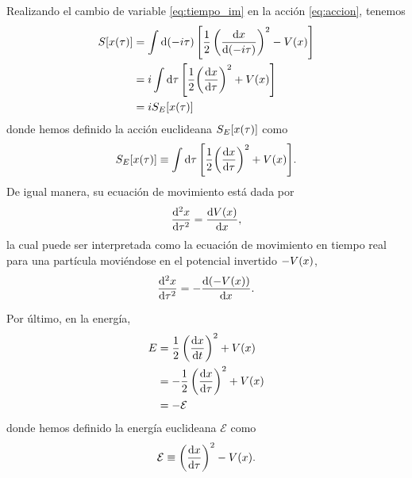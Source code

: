 Realizando el cambio de variable \eqref{eq:tiempo_im} en la acción \eqref{eq:accion}, tenemos
\begin{align}
S\qty[x\qty(\tau)] &= \int \dd{\qty(-i\tau)} \qty[ \frac{1}{2} \left(\dv{x}{\qty(-i\tau)}\right)^2 - V(x)] \\
&= i \int \dd{\tau} \qty[ \frac{1}{2}\qty(\dv{x}{\tau})^2 + V(x)] \\
&= iS_E\qty[x\qty(\tau)] \label{eq:S_s_e}
\end{align}
donde hemos definido la acción euclideana $S_E\qty[x\qty(\tau)]$ como 
\begin{equation}\label{eq:eucliaction}
S_E\qty[x\qty(\tau)] \equiv \int \dd{\tau} \qty[ \frac{1}{2}\qty(\dv{x}{\tau})^2 + V(x)].
\end{equation}
De igual manera, su ecuación de movimiento está dada por
\begin{equation}\label{eq:mov_ec}
\dv[2]{x}{\tau} = \dv{V(x)}{x},
\end{equation}
la cual puede ser interpretada como la ecuación de movimiento en tiempo real para una partícula moviéndose en el potencial invertido $-V\qty(x)$,
\begin{equation}
\dv[2]{x}{\tau} = -\dv{\qty(-V(x))}{x}.
\end{equation}
 
Por último, en la energía, 
\begin{align}
	E &= \frac{1}{2} \left(\dv{x}{t}\right)^2 + V\qty(x) \\
	&= -\frac{1}{2} \left(\dv{x}{\tau}\right)^2 + V\qty(x) \\
	&= -\mathcal{E}
\end{align}
donde hemos definido la energía euclideana $\mathcal{E}$ como \cite{rubakov2009classical}
\begin{equation} \label{eq:E_eucli}
	\mathcal{E}  \equiv \left(\dv{x}{\tau}\right)^2 - V\qty(x).
\end{equation}

